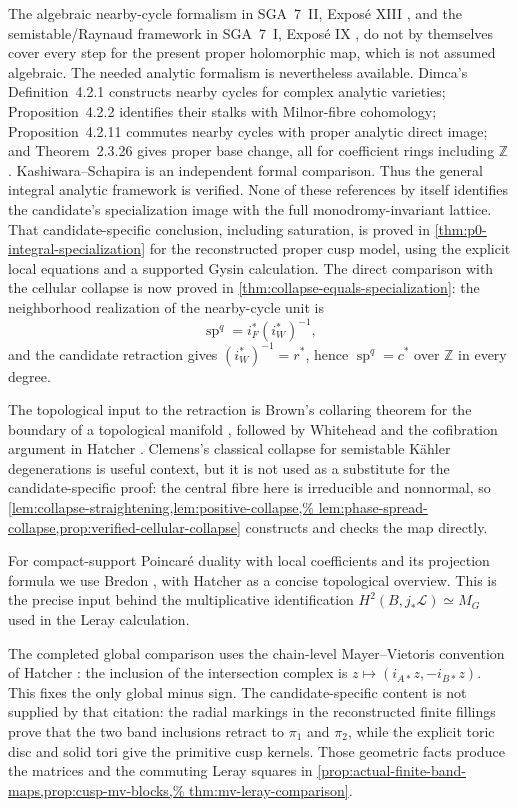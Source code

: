 The algebraic nearby-cycle formalism in SGA~7~II, Expos\'e XIII
\cite{SGA7II1973}, and the semistable/Raynaud framework in SGA~7~I,
Expos\'e IX \cite{SGA7I1972}, do not by themselves cover every step for the
present proper holomorphic map, which is not assumed algebraic.  The needed
analytic formalism is nevertheless available.  Dimca's Definition~4.2.1
constructs nearby cycles for complex analytic varieties; Proposition~4.2.2
identifies their stalks with Milnor-fibre cohomology; Proposition~4.2.11
commutes nearby cycles with proper analytic direct image; and
Theorem~2.3.26 gives proper base change, all for coefficient rings including
\(\mathbb Z\) \cite{Dimca2004}.  Kashiwara--Schapira
\cite[\S8.6]{KashiwaraSchapira1990} is an independent formal comparison.
Thus the general integral analytic framework is verified.  None of these
references by itself identifies the candidate's specialization image with
the full monodromy-invariant lattice.  That candidate-specific conclusion,
including saturation, is proved in
\cref{thm:p0-integral-specialization} for the reconstructed proper cusp
model, using the explicit local equations and a supported Gysin calculation.
The direct comparison with the cellular collapse is now proved in
\cref{thm:collapse-equals-specialization}: the neighborhood realization of
the nearby-cycle unit is
\[
 \operatorname{sp}^q=i_F^*(i_W^*)^{-1},
\]
and the candidate retraction gives $(i_W^*)^{-1}=r^*$, hence
$\operatorname{sp}^q=c^*$ over $\mathbb Z$ in every degree.

The topological input to the retraction is Brown's collaring theorem for the
boundary of a topological manifold \cite{Brown1962}, followed by Whitehead and
the cofibration argument in Hatcher \cite{Hatcher2002}.  Clemens's classical
collapse for semistable K\"ahler degenerations \cite{Clemens1977} is useful
context, but it is not used as a substitute for the candidate-specific proof:
the central fibre here is irreducible and nonnormal, so
\cref{lem:collapse-straightening,lem:positive-collapse,%
lem:phase-spread-collapse,prop:verified-cellular-collapse} constructs and
checks the map directly.

For compact-support Poincar\'e duality with local coefficients and its
projection formula we use Bredon \cite[Chapter~VI]{Bredon1997}, with
Hatcher \cite[\S3.H]{Hatcher2002} as a concise topological overview.  This
is the precise input behind the multiplicative identification
\(H^2(B,j_*\mathcal L)\simeq M_G\) used in the Leray calculation.

The completed global comparison uses the chain-level Mayer--Vietoris
convention of Hatcher \cite[\S2.2, pp.~149--150]{Hatcher2002}: the inclusion
of the intersection complex is \(z\mapsto(i_{A*}z,-i_{B*}z)\).  This fixes
the only global minus sign.  The candidate-specific content is not supplied
by that citation: the radial markings in the reconstructed finite fillings
prove that the two band inclusions retract to \(\pi_1\) and \(\pi_2\), while
the explicit toric disc and solid tori give the primitive cusp kernels.
Those geometric facts produce the matrices and the commuting Leray squares
in \cref{prop:actual-finite-band-maps,prop:cusp-mv-blocks,%
thm:mv-leray-comparison}.

